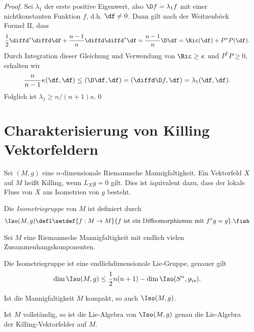 \documentclass[%
	paper=a5,%
	fleqn,%
	DIV=18,%
	BCOR=0mm,
	fontsize=11pt,
	titlepage=false,%
	bibliography=totoc,
	DIV=18,%
	twoside=true,
	pdftitle=Riemannsche Geometrie,
	pdfauthor=Uwe Semmelmann,
	numbers=noendperiod]%
	{scrbook}
\begin{document}
\begin{proof}
Sei $\lambda_{1}$ der erste positive Eigenwert, also $\D f = \lambda_{1}f$ mit einer nichtkonstanten Funktion $f$, d.h. $\df \neq 0$. Dann gilt nach der Weitzenböck Formel II, dass
\begin{align*}
\frac{1}{2}\diffd^*\diffd\df + \frac{n-1}{n}\diffd\diffd^*\df = 
\frac{n-1}{n}\D\df = 
\Ric(\df) + P^*P(\df).
\end{align*}
Durch Integration dieser Gleichung und Verwendung von $\Ric \ge \kappa$ und $P^*P \ge 0$, erhalten wir
\begin{align*}
\frac{n}{n-1}\kappa(\df,\df) \le (\D\df,\df) = (\diffd\D f,\df) = \lambda_{1}(\df,\df).
\end{align*}
Folglich ist $\lambda_{1} \ge n/(n+1)\kappa$.\qed
\end{proof}

\section{Charakterisierung von Killing Vektorfeldern}

Sei $(M,g)$ eine $n$-dimensionale Riemannsche Mannigfaltigkeit. Ein Vektorfeld $X$ auf $M$ heißt Killing, wenn $L_{X}g = 0$ gilt. Dies ist äquivalent dazu, dass der lokale Fluss von $X$ aus Isometrien von $g$ besteht.

\begin{defn}
Die \emph{Isometriegruppe} von $M$ ist definiert durch
\begin{align*}
\Iso(M,g) \defl \setdef{f: M\to M}{f\text{ ist ein Diffeomorphismus mit }f^*g = g}.\fish
\end{align*}
\end{defn}

\begin{prop}
Sei $M$ eine Riemannsche Mannigfaltigkeit mit endlich vielen Zusammenhangskomponenten.
\begin{propenum}
\item 
Die Isometriegruppe ist eine endlichdimensionale Lie-Gruppe, genauer gilt
\begin{align*}
\dim \Iso(M,g) \le \frac{1}{2}n(n+1) - \dim \Iso(S^n,g_{\o}).
\end{align*}
\item Ist die Mannigfaltigkeit $M$ kompakt, so auch $\Iso(M,g)$.
\item Ist $M$ vollständig, so ist die Lie-Algebra von $\Iso(M,g)$ genau die Lie-Algebra der Killing-Vektorfelder auf $M$.\fish
\end{propenum}
\end{prop}
\end{document}
